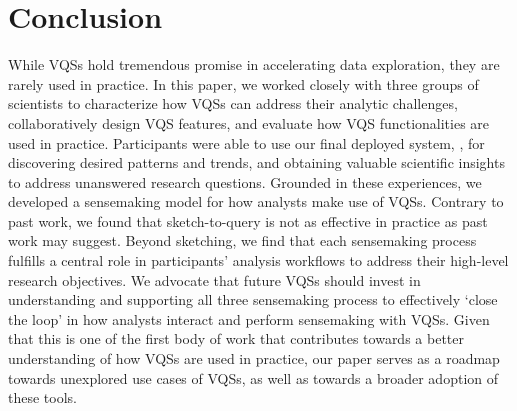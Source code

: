 \section{Conclusion\label{sec:conclusion}}
While VQSs hold tremendous promise in accelerating data exploration, they are rarely used in practice. In this paper, we worked closely with three groups of scientists to characterize how VQSs can address their analytic challenges, collaboratively design VQS features, and evaluate how VQS functionalities are used in practice. Participants were able to use our final deployed system, \zvpp, for discovering desired patterns and trends, and obtaining valuable scientific insights to address unanswered research questions. Grounded in these experiences, we developed a sensemaking model for how analysts make use of VQSs. Contrary to past work, we found that sketch-to-query is not as effective in practice as past work may suggest. Beyond sketching, we find that each sensemaking process fulfills a central role in participants' analysis workflows to address their high-level research objectives. We advocate that future VQSs should invest in understanding and supporting all three sensemaking process to effectively `close the loop' in how analysts interact and perform sensemaking with VQSs. Given that this is one of the first body of work that contributes towards a better understanding of how VQSs are used in practice, our paper serves as a roadmap towards unexplored use cases of VQSs, as well as towards a broader adoption of these tools.
